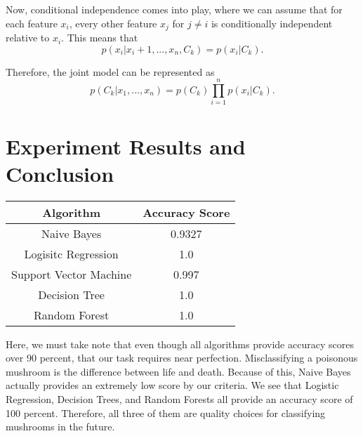 \documentclass[11pt, letterpaper]{article}
\begin{document}
Now, conditional independence comes into play, where we can assume that for each feature $x_i$, every other feature $x_j$ for $j \neq i$ is conditionally independent relative to $x_i$. This means that 
$$p(x_i | x_i+1,...,x_n, C_k) = p(x_i | C_k).$$

Therefore, the joint model can be represented as $$p(C_k | x_1,...,x_n) = p(C_k) \prod_{i=1}^{n}p(x_i | C_k).$$

\section{Experiment Results and Conclusion}
\begin{center}
\begin{tabular}{ |c|c|}
\hline
Algorithm & Accuracy Score \\
\hline
Naive Bayes & 0.9327 \\
Logisitc Regression & 1.0 \\
Support Vector Machine & 0.997 \\
Decision Tree & 1.0 \\
Random Forest & 1.0 \\
\hline
\end{tabular}
\end{center}

Here, we must take note that even though all algorithms provide accuracy scores over 90 percent, that our task requires near perfection. Misclassifying a poisonous mushroom is the difference between life and death. Because of this, Naive Bayes actually provides an extremely low score by our criteria. We see that Logistic Regression, Decision Trees, and Random Forests all provide an accuracy score of 100 percent. Therefore, all three of them are quality choices for classifying mushrooms in the future.
\end{document}
